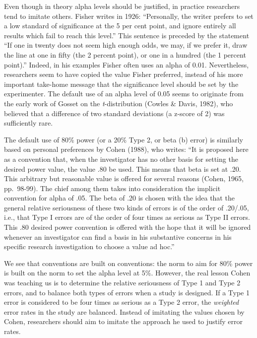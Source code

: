 \documentclass[
  english,
  ,man,floatsintext]{apa6}
\begin{document}
Even though in theory alpha levels should be justified, in practice researchers tend to imitate others. Fisher writes in 1926: ``Personally, the writer prefers to set a low standard of significance at the 5 per cent point, and ignore entirely all results which fail to reach this level.'' This sentence is preceded by the statement ``If one in twenty does not seem high enough odds, we may, if we prefer it, draw the line at one in fifty (the 2 percent point), or one in a hundred (the 1 percent point).'' Indeed, in his examples Fisher often uses an alpha of 0.01. Nevertheless, researchers seem to have copied the value Fisher preferred, instead of his more important take-home message that the significance level should be set by the experimenter. The default use of an alpha level of 0.05 seems to originate from the early work of Gosset on the \emph{t}-distribution (Cowles \& Davis, 1982), who believed that a difference of two standard deviations (a z-score of 2) was sufficiently rare.

The default use of 80\% power (or a 20\% Type 2, or beta (b) error) is similarly based on personal preferences by Cohen (1988), who writes: ``It is proposed here as a convention that, when the investigator has no other basis for setting the desired power value, the value .80 be used. This means that beta is set at .20. This arbitrary but reasonable value is offered for several reasons (Cohen, 1965, pp.~98-99). The chief among them takes into consideration the implicit convention for alpha of .05. The beta of .20 is chosen with the idea that the general relative seriousness of these two kinds of errors is of the order of .20/.05, i.e., that Type I errors are of the order of four times as serious as Type II errors. This .80 desired power convention is offered with the hope that it will be ignored whenever an investigator can find a basis in his substantive concerns in his specific research investigation to choose a value ad hoc.''

We see that conventions are built on conventions: the norm to aim for 80\% power is built on the norm to set the alpha level at 5\%. However, the real lesson Cohen was teaching us is to determine the relative seriousness of Type 1 and Type 2 errors, and to balance both types of errors when a study is designed. If a Type 1 error is considered to be four times as serious as a Type 2 error, the \emph{weighted} error rates in the study are balanced. Instead of imitating the values chosen by Cohen, researchers should aim to imitate the approach he used to justify error rates.
\end{document}
